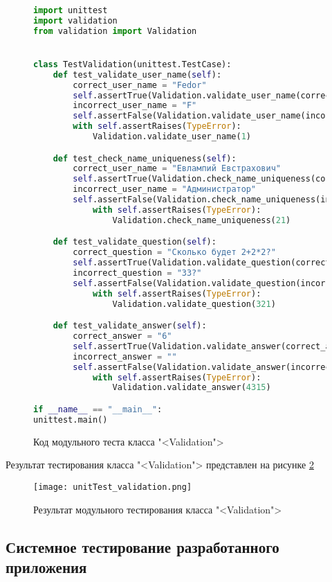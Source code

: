 \begin{figure}[H]
\begin{lstlisting}[language=Python]
import unittest
import validation
from validation import Validation


class TestValidation(unittest.TestCase):
	def test_validate_user_name(self):
		correct_user_name = "Fedor"
		self.assertTrue(Validation.validate_user_name(correct_user_name))
		incorrect_user_name = "F"
		self.assertFalse(Validation.validate_user_name(incorrect_user_name))
		with self.assertRaises(TypeError):
			Validation.validate_user_name(1)

	def test_check_name_uniqueness(self):
		correct_user_name = "Евлампий Евстрахович"
		self.assertTrue(Validation.check_name_uniqueness(correct_user_name))
		incorrect_user_name = "Администратор"
		self.assertFalse(Validation.check_name_uniqueness(incorrect_user_name))
			with self.assertRaises(TypeError):
				Validation.check_name_uniqueness(21)

	def test_validate_question(self):
		correct_question = "Сколько будет 2+2*2?"
		self.assertTrue(Validation.validate_question(correct_question))
		incorrect_question = "33?"
		self.assertFalse(Validation.validate_question(incorrect_question))
			with self.assertRaises(TypeError):
				Validation.validate_question(321)

	def test_validate_answer(self):
		correct_answer = "6"
		self.assertTrue(Validation.validate_answer(correct_answer))
		incorrect_answer = ""
		self.assertFalse(Validation.validate_answer(incorrect_answer))
			with self.assertRaises(TypeError):
				Validation.validate_answer(4315)

if __name__ == "__main__":
unittest.main()
\end{lstlisting}  
\caption{Код модульного теста класса "<Validation">}
\label{unitTestValidation_code:image}
\end{figure}

Результат тестирования класса "<Validation"> представлен на рисунке \ref{unitTest_validation_result:image}

\begin{figure}[H]
	\centering
	\texttt{[image: unitTest\_validation.png]}
	\caption{Результат модульного тестирования класса "<Validation">}
	\label{unitTest_validation_result:image}
\end{figure}

\subsection{Системное тестирование разработанного приложения}

